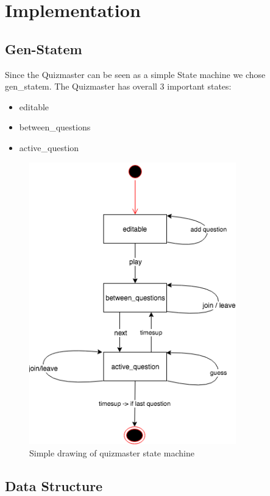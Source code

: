 \documentclass[12pt,a4paper]{article}
\begin{document}
\section{Implementation}
\subsection{Gen-Statem}
Since the Quizmaster can be seen as a simple State machine we chose gen\_statem.
The Quizmaster has overall 3 important states:
\begin{itemize}
	\item editable
	\item between\_questions
	\item active\_question
\end{itemize} 

\begin{figure}
\begin{center}
		\includegraphics[width=0.8\textwidth]{images/Quizmaster}
\end{center}
	\caption{Simple drawing of quizmaster state machine}
\end{figure}

\subsection{Data Structure}
\end{document}
